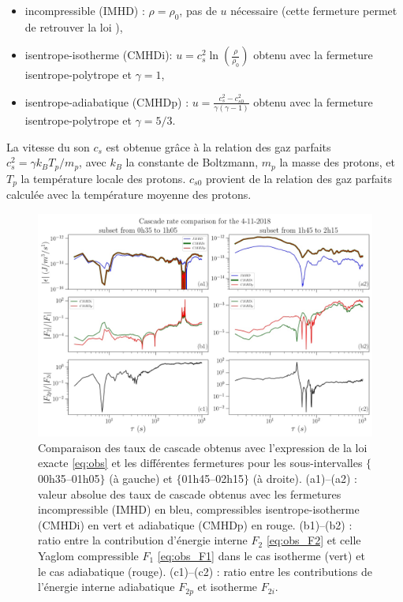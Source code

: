 \begin{itemize}
    \item incompressible (IMHD) : $\rho = \rho_0$, pas de $u$ nécessaire (cette fermeture permet de retrouver la loi ),
    \item isentrope-isotherme (CMHDi): $u = c_s^2 \ln(\frac{\rho}{\rho_0})$ obtenu avec la fermeture isentrope-polytrope et $\gamma = 1$,
    \item isentrope-adiabatique (CMHDp) : $u = \frac{c_s^2 -c_{s0}^2}{\gamma(\gamma -1)}$ obtenu avec la fermeture isentrope-polytrope et $\gamma = 5/3$.
\end{itemize}
La vitesse du son $c_s$ est obtenue grâce à la relation des gaz parfaits $c_s^2 = \gamma k_B T_p /m_p$, avec $k_B$ la constante de Boltzmann, $m_p$ la masse des protons, et $T_p$ la température locale des protons. $c_{s0}$ provient de la relation des gaz parfaits calculée avec la température moyenne des protons.
\begin{figure}[!ht]
 \centering
\includegraphics[width=\linewidth,trim=0cm 0cm 0cm 0cm, clip=false]{./Mainmatter/Part_1/images/Fig_04112018H_00_results}
\caption{Comparaison des taux de cascade obtenus avec l'expression de la loi exacte \eqref{eq:obs} et les différentes fermetures pour les sous-intervalles $\{$00h35–01h05$\}$ (à gauche) et $\{$01h45–02h15$\}$ (à droite). (a1)–(a2) : valeur absolue des taux de cascade obtenus avec les fermetures incompressible (IMHD) en bleu, compressibles isentrope-isotherme (CMHDi) en vert et adiabatique (CMHDp) en rouge. (b1)–(b2) : ratio entre la contribution d'énergie interne $F_2$ \eqref{eq:obs_F2} et celle Yaglom compressible $F_1$ \eqref{eq:obs_F1} dans le cas isotherme (vert) et le cas adiabatique (rouge). (c1)–(c2) : ratio entre les contributions de l'énergie interne adiabatique $F_{2p}$ et isotherme $F_{2i}$.}
\label{fig:loi_PSP}
\end{figure}

